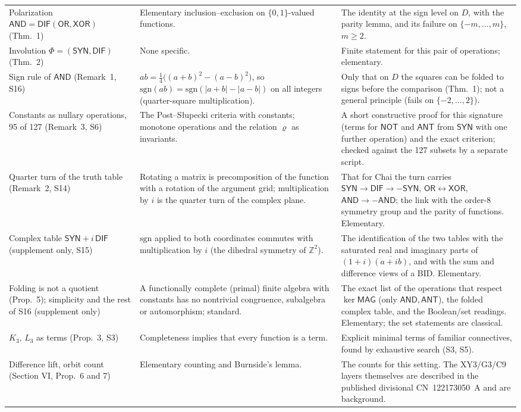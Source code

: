\documentclass[10pt,a4paper]{article}
\newcommand{\D}{D}\newcommand{\Z}{\mathcal Z}\newcommand{\SYN}{\mathsf{SYN}}\newcommand{\DIF}{\mathsf{DIF}}\newcommand{\OR}{\mathsf{OR}}\newcommand{\XOR}{\mathsf{XOR}}\newcommand{\AND}{\mathsf{AND}}\newcommand{\NOT}{\mathsf{NOT}}\newcommand{\ANT}{\mathsf{ANT}}\newcommand{\MAX}{\mathsf{MAX}}\newcommand{\MIN}{\mathsf{MIN}}\newcommand{\MAG}{\mathsf{MAG}}\newcommand{\chai}{Chai}\newcommand{\Fone}{\mathcal F_1}\newcommand{\Ftwo}{\mathcal F_2}\usepackage{tikz}\usetikzlibrary{arrows.meta,positioning}\newcommand{\yang}{\rule{0.8em}{0.18ex}}\newcommand{\yin}{\rule{0.25em}{0.18ex}\hspace{0.3em}\rule{0.25em}{0.18ex}}\newcommand{\tri}[3]{\raisebox{-0.01ex}{\shortstack[c]{#1\\[-0.3ex]#2\\[-0.3ex]#3}}}\newcommand{\iv}[1]{[\![#1]\!]}
\begin{document}
\begin{center}
\begin{longtable}{>{\raggedright\arraybackslash}p{3.6cm}>{\raggedright\arraybackslash}p{5.6cm}>{\raggedright\arraybackslash}p{6.6cm}}
Polarization $\AND=\DIF(\OR,\XOR)$ (Thm.~1)&Elementary inclusion--exclusion on $\{0,1\}$-valued functions.&The identity at the sign level on $\D$, with the parity lemma, and its failure on $\{-m,\dots,m\}$, $m\ge2$.\\
Involution $\Phi=(\SYN,\DIF)$ (Thm.~2)&None specific.&Finite statement for this pair of operations; elementary.\\
Sign rule of $\AND$ (Remark~1, S16)&$ab=\tfrac14\big((a+b)^2-(a-b)^2\big)$, so $\mathrm{sgn}(ab)=\mathrm{sgn}(|a+b|-|a-b|)$ on all integers (quarter-square multiplication).&Only that on $\D$ the squares can be folded to signs before the comparison (Thm.~1); not a general principle (fails on $\{-2,\dots,2\}$).\\
Constants as nullary operations, 95 of 127 (Remark~3, S6)&The Post--S\l upecki criteria with constants; monotone operations and the relation $\varrho$ as invariants.&A short constructive proof for this signature (terms for $\NOT$ and $\ANT$ from $\SYN$ with one further operation) and the exact criterion; checked against the 127 subsets by a separate script.\\
Quarter turn of the truth table (Remark~2, S14)&Rotating a matrix is precomposition of the function with a rotation of the argument grid; multiplication by $i$ is the quarter turn of the complex plane.&That for \chai{} the turn carries $\SYN\to\DIF\to-\SYN$, $\OR\leftrightarrow\XOR$, $\AND\to-\AND$; the link with the order-8 symmetry group and the parity of functions. Elementary.\\
Complex table $\SYN+i\,\DIF$ (supplement only, S15)&$\mathrm{sgn}$ applied to both coordinates commutes with multiplication by $i$ (the dihedral symmetry of $\mathbb Z^2$).&The identification of the two tables with the saturated real and imaginary parts of $(1+i)\overline{(a+ib)}$, and with the sum and difference views of a BID. Elementary.\\
Folding is not a quotient (Prop.~5); simplicity and the rest of S16 (supplement only)&A functionally complete (primal) finite algebra with constants has no nontrivial congruence, subalgebra or automorphism; standard.&The exact list of the operations that respect $\ker\MAG$ (only $\AND,\ANT$), the folded complex table, and the Boolean/set readings. Elementary; the set statements are classical.\\
$K_3$, $L_3$ as terms (Prop.~3, S3)&Completeness implies that every function is a term.&Explicit minimal terms of familiar connectives, found by exhaustive search (S3, S5).\\
Difference lift, orbit count (Section VI, Prop.~6 and 7)&Elementary counting and Burnside's lemma.&The counts for this setting. The XY3/G3/C9 layers themselves are described in the published divisional CN~122173050~A and are background.\\
\bottomrule\end{longtable}\end{center}
\end{document}
